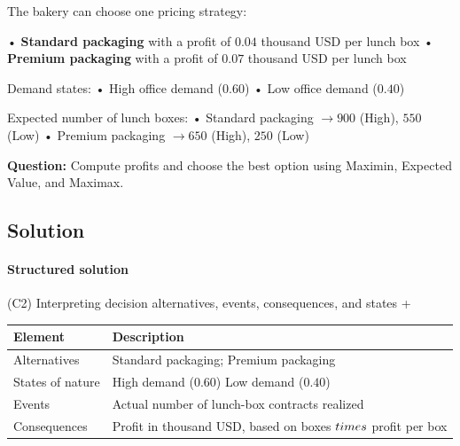 \documentclass[11pt]{article}
\begin{document}
	
	The bakery can choose one pricing strategy:
	
	
	
	
	
	
	• \textbf{Standard packaging} with a profit of $0.04$ thousand USD per lunch box
	• \textbf{Premium packaging} with a profit of $0.07$ thousand USD per lunch box
	
	
	
	
	
	
	Demand states:
	• High office demand ($0.60$)
	• Low office demand ($0.40$)
	
	
	
	
	
	
	Expected number of lunch boxes:
	• Standard packaging $\to 900$ (High), $550$ (Low)
	• Premium packaging $\to 650$ (High), $250$ (Low)
	
	
	
	
	
	\textbf{Question:} Compute profits and choose the best option using Maximin, Expected Value, and Maximax.
	
	\subsection*{Solution}
	
	\hypertarget{problem4-solution}{}
	
	\paragraph{Structured solution}
	
	
	(C2) Interpreting decision alternatives, events, consequences, and states
	+
	
	
	\begin{center}
		\begin{tabular}{ll}
			\toprule
			Element & Description \\
			\midrule
			Alternatives & Standard packaging; Premium packaging \\
			States of nature & High demand
			($0.60$)
			Low demand
			($0.40$) \\
			Events & Actual number of lunch-box contracts realized \\
			Consequences & Profit in thousand USD, based on boxes $\\times$ profit per box \\
			\bottomrule
		\end{tabular}
	\end{center}
	
\end{document}
